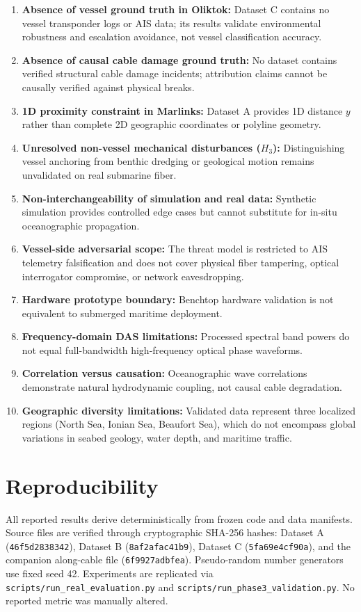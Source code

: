 \documentclass[conference]{IEEEtran}
\begin{document}
\begin{enumerate}
\item \textbf{Absence of vessel ground truth in Oliktok:} Dataset C contains no vessel transponder logs or AIS data; its results validate environmental robustness and escalation avoidance, not vessel classification accuracy.
\item \textbf{Absence of causal cable damage ground truth:} No dataset contains verified structural cable damage incidents; attribution claims cannot be causally verified against physical breaks.
\item \textbf{1D proximity constraint in Marlinks:} Dataset A provides 1D distance $y$ rather than complete 2D geographic coordinates or polyline geometry.
\item \textbf{Unresolved non-vessel mechanical disturbances ($H_3$):} Distinguishing vessel anchoring from benthic dredging or geological motion remains unvalidated on real submarine fiber.
\item \textbf{Non-interchangeability of simulation and real data:} Synthetic simulation provides controlled edge cases but cannot substitute for in-situ oceanographic propagation.
\item \textbf{Vessel-side adversarial scope:} The threat model is restricted to AIS telemetry falsification and does not cover physical fiber tampering, optical interrogator compromise, or network eavesdropping.
\item \textbf{Hardware prototype boundary:} Benchtop hardware validation is not equivalent to submerged maritime deployment.
\item \textbf{Frequency-domain DAS limitations:} Processed spectral band powers do not equal full-bandwidth high-frequency optical phase waveforms.
\item \textbf{Correlation versus causation:} Oceanographic wave correlations demonstrate natural hydrodynamic coupling, not causal cable degradation.
\item \textbf{Geographic diversity limitations:} Validated data represent three localized regions (North Sea, Ionian Sea, Beaufort Sea), which do not encompass global variations in seabed geology, water depth, and maritime traffic.
\end{enumerate}

\section{Reproducibility}

All reported results derive deterministically from frozen code and data manifests. Source files are verified through cryptographic SHA-256 hashes: Dataset A (\texttt{46f5d2838342}), Dataset B (\texttt{8af2afac41b9}), Dataset C (\texttt{5fa69e4cf90a}), and the companion along-cable file (\texttt{6f9927adbfea}). Pseudo-random number generators use fixed seed 42. Experiments are replicated via \texttt{scripts/run\_real\_evaluation.py} and \texttt{scripts/run\_phase3\_validation.py}. No reported metric was manually altered.
\end{document}
